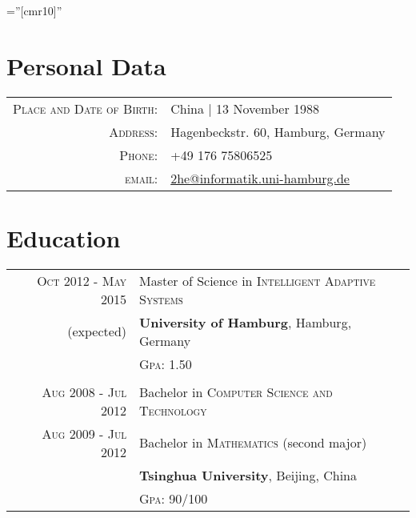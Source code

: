 \documentclass[a4paper,11pt]{article} %
\begin{document}
\pagestyle{empty} %

\font\fb=''[cmr10]'' %


\par{\bigskip\par} %

\section{Personal Data}

\begin{tabular}{rl}
\textsc{Place and Date of Birth:} & China | 13 November 1988 \\
\textsc{Address:} & Hagenbeckstr. 60, Hamburg, Germany \\
\textsc{Phone:} & +49 176 75806525\\
\textsc{email:} & \href{mailto:2he@informatik.uni-hamburg.de}{2he@informatik.uni-hamburg.de}
\end{tabular}


\section{Education}
\begin{tabular}{r|p{11cm}}	
  \textsc{Oct 2012 - May 2015} & Master of Science in \textsc{Intelligent Adaptive Systems} \\
  {\small (expected)} & \textbf{University of Hamburg}, Hamburg, Germany \\
  & \textsc{Gpa}: 1.50 \\
  \multicolumn{2}{c}{} \\


  \textsc{Aug 2008 - Jul 2012} & Bachelor in \textsc{Computer Science and Technology} \\
  \textsc{Aug 2009 - Jul 2012} & Bachelor in \textsc{Mathematics} (second major) \\
  & \textbf{Tsinghua University}, Beijing, China \\
  & \textsc{Gpa}: 90/100 \\

\end{tabular}
\end{document}

